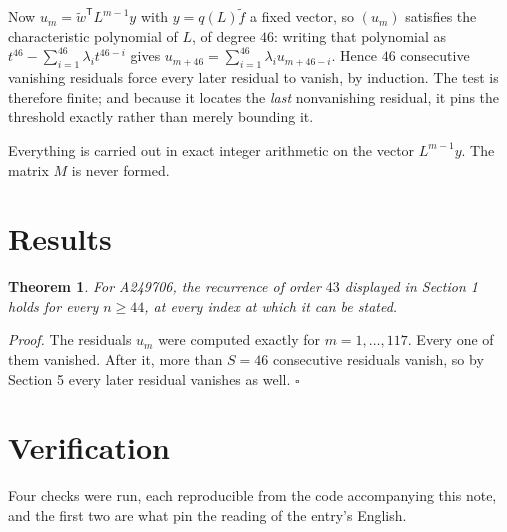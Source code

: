 \documentclass[11pt]{article}
\newtheorem{theorem}{Theorem}
\theoremstyle{definition}
\begin{document}
Now $u_m = \tilde w^{\mathsf T} L^{m-1} y$ with $y = q(L)\tilde f$ a fixed vector, so $(u_m)$ satisfies the characteristic polynomial of $L$, of degree $46$: writing that polynomial as $t^{46} - \sum_{i=1}^{46} \lambda_i t^{46-i}$ gives $u_{m+46} = \sum_{i=1}^{46} \lambda_i u_{m+46-i}$. Hence $46$ consecutive vanishing residuals force every later residual to vanish, by induction. The test is therefore finite; and because it locates the {\itshape last} nonvanishing residual, it pins the threshold exactly rather than merely bounding it.

Everything is carried out in exact integer arithmetic on the vector $L^{m-1}y$. The matrix $M$ is never formed.

\section{Results}

\begin{theorem} For A249706, the recurrence of order $43$ displayed in Section 1 holds for every $n \ge 44$, at every index at which it can be stated.\end{theorem}

{\itshape Proof.} The residuals $u_m$ were computed exactly for $m = 1,\dots,117$. Every one of them vanished. After it, more than $S = 46$ consecutive residuals vanish, so by Section 5 every later residual vanishes as well. $\square$

\section{Verification}

Four checks were run, each reproducible from the code accompanying this note, and the first two are what pin the reading of the entry's English.
\end{document}
